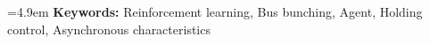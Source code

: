 

\vspace{1em}

\noindent \hangindent=4.9em \textbf{Keywords: }Reinforcement learning, Bus bunching, Agent, Holding control, Asynchronous characteristics